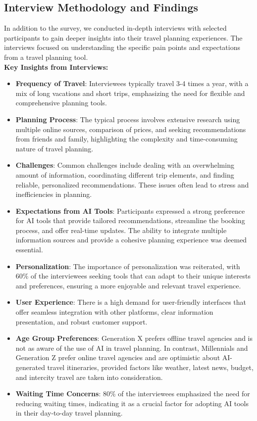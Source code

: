 \documentclass[conference]{IEEEtran}
\begin{document}
    \subsection{Interview Methodology and Findings}
        In addition to the survey, we conducted in-depth interviews with selected participants to gain deeper insights into their travel planning experiences. The interviews focused on understanding the specific pain points and expectations from a travel planning tool.
        \\

        \textbf{Key Insights from Interviews:}

        \begin{itemize}
            \item \textbf{Frequency of Travel}: Interviewees typically travel 3-4 times a year, with a mix of long vacations and short trips, emphasizing the need for flexible and comprehensive planning tools.
            \item \textbf{Planning Process}: The typical process involves extensive research using multiple online sources, comparison of prices, and seeking recommendations from friends and family, highlighting the complexity and time-consuming nature of travel planning.
            \item \textbf{Challenges}: Common challenges include dealing with an overwhelming amount of information, coordinating different trip elements, and finding reliable, personalized recommendations. These issues often lead to stress and inefficiencies in planning.
            \item \textbf{Expectations from AI Tools}: Participants expressed a strong preference for AI tools that provide tailored recommendations, streamline the booking process, and offer real-time updates. The ability to integrate multiple information sources and provide a cohesive planning experience was deemed essential.
            \item \textbf{Personalization}: The importance of personalization was reiterated, with 60\% of the interviewees seeking tools that can adapt to their unique interests and preferences, ensuring a more enjoyable and relevant travel experience.
            \item \textbf{User Experience}: There is a high demand for user-friendly interfaces that offer seamless integration with other platforms, clear information presentation, and robust customer support.
            \item \textbf{Age Group Preferences}: Generation X prefers offline travel agencies and is not as aware of the use of AI in travel planning. In contrast, Millennials and Generation Z prefer online travel agencies and are optimistic about AI-generated travel itineraries, provided factors like weather, latest news, budget, and intercity travel are taken into consideration.
            \item \textbf{Waiting Time Concerns}: 80\% of the interviewees emphasized the need for reducing waiting times, indicating it as a crucial factor for adopting AI tools in their day-to-day travel planning.
        \end{itemize}
\end{document}
